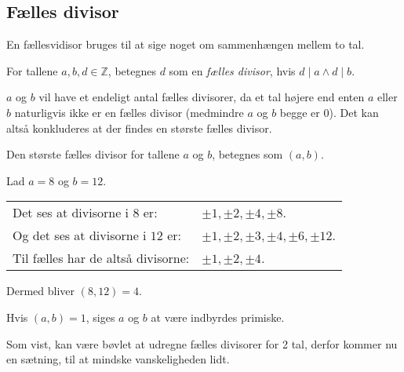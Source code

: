 

\subsection{Fælles divisor}
En fællesvidisor bruges til at sige noget om sammenhængen mellem to tal.

\begin{definition}
    For tallene \(a, b, d \in \mathbb{Z}\), betegnes \(d\) som en \emph{fælles divisor}, hvis \(d \mid a \land d \mid b\).
\end{definition}

\(a\) og \(b\) vil have et endeligt antal fælles divisorer, da et tal højere end enten \(a\) eller \(b\) naturligvis ikke er en fælles divisor (medmindre \(a\) og \(b\) begge er \(0\)).
Det kan altså konkluderes at der findes en største fælles divisor.

\begin{definition}
    Den største fælles divisor for tallene \(a\) og \(b\), betegnes som \((a, b)\).
\end{definition}

\begin{eks}
    Lad \(a = 8\) og \(b = 12\).\\
    \begin{tabular*}{\textwidth}{@{} l l}
        Det ses at divisorne i \(8\) er:      & \(\pm 1, \pm 2, \pm 4, \pm 8\).\\
        Og det ses at divisorne i \(12\) er:  & \(\pm 1, \pm 2, \pm 3, \pm 4, \pm 6, \pm 12\).\\
        Til fælles har de altså divisorne:    & \(\pm 1, \pm 2, \pm 4\).
    \end{tabular*}

    Dermed bliver \((8, 12) = 4\).
\end{eks}


\begin{definition}
    Hvis \((a, b) = 1\), siges \(a\) og \(b\) at være indbyrdes primiske.
\end{definition}

Som vist, kan være bøvlet at udregne fælles divisorer for 2 tal, derfor kommer nu en sætning, til at mindske vanskeligheden lidt.

